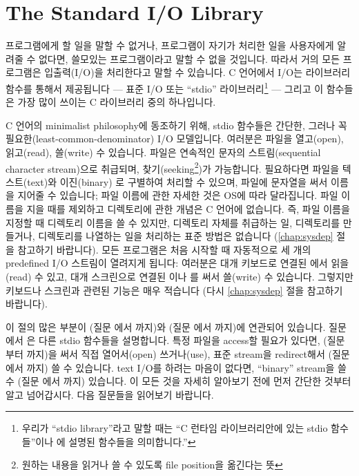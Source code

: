 \chapter{The Standard I/O Library}	\label{chap:stdio}

프로그램에게 할 일을 말할 수 없거나, 프로그램이 자기가 처리한 일을 
사용자에게 알려줄 수 없다면, 쓸모있는 프로그램이라고 말할 수 없을 것입니다.
따라서 거의 모든 프로그램은 입출력(I/O)을 처리한다고 말할 수 있습니다.
C 언어에서 I/O는 라이브러리 함수를 통해서 제공됩니다 --- 표준 I/O 또는
``stdio'' 라이브러리\footnote{우리가 ``stdio library''라고 말할 때는
``C 런타임 라이브러리안에 있는 stdio 함수들''이나 에
설명된 함수들을 의미합니다.''} --- 그리고 이 함수들은 가장 많이 쓰이는
C 라이브러리 중의 하나입니다.

C 언어의 minimalist philosophy에 동조하기 위해, stdio 함수들은 간단한,
그러나 꼭 필요한(least-common-denominator) I/O 모델입니다.
여러분은 파일을 열고(open), 읽고(read), 쓸(write) 수 있습니다.
파일은 연속적인 문자의 스트림(sequential character stream)으로 취급되며,
찾기(seeking\footnote{원하는 내용을 읽거나 쓸 수 있도록 file position을
옮긴다는 뜻})가 가능합니다.   필요하다면 파일을 텍스트(text)와 이진(binary)
로 구별하여 처리할 수 있으며, 파일에 문자열을 써서 이름을 지어줄 수 있습니다;
파일 이름에 관한 자세한 것은 OS에 따라 달라집니다.   파일 이름을 지을 때를
제외하고 디렉토리에 관한 개념은 C 언어에 없습니다.   즉, 파일 이름을 지정할
때 디렉토리 이름을 쓸 수 있지만, 디렉토리 자체를 취급하는 일,  디렉토리를
만들거나, 디렉토리를 나열하는 일을 처리하는 표준 방법은 없습니다
(\ref{chap:sysdep} 절을 참고하기 바랍니다).   모든 프로그램은 처음
시작할 때 자동적으로 세 개의 predefined I/O 스트림이 열려지게 됩니다:
여러분은 대개 키보드로 연결된 에서 읽을(read) 수 있고,
대개 스크린으로 연결된 이나 를 써서 쓸(write) 수
있습니다.   그렇지만 키보드나 스크린과 관련된 기능은 매우 적습니다
(다시 \ref{chap:sysdep} 절을 참고하기 바랍니다).

이 절의 많은 부분이  (질문 에서 까지)와
 (질문 에서 까지)에 연관되어 있습니다.  질문
에서 은 다른 stdio 함수들을 설명합니다.  특정 파일을
access할 필요가 있다면,  (질문 부터 까지)을 써서
직접 열어서(open) 쓰거나(use), 표준 stream을 redirect해서 (질문 에서
까지) 쓸 수 있습니다.  text I/O를 하려는 마음이 없다면, ``binary''
stream을 쓸 수 (질문 에서 까지) 있습니다.  이 모든 것을
자세히 알아보기 전에 먼저 간단한 것부터 알고 넘어갑시다.  다음 질문들을
읽어보기 바랍니다.

